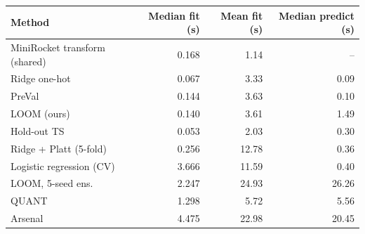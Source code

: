\begin{tabular}{lrrr}
\toprule
Method & Median fit (s) & Mean fit (s) & Median predict (s) \\
\midrule
MiniRocket transform (shared) & 0.168 & 1.14 & -- \\
Ridge one-hot & 0.067 & 3.33 & 0.09 \\
PreVal & 0.144 & 3.63 & 0.10 \\
LOOM (ours) & 0.140 & 3.61 & 1.49 \\
Hold-out TS & 0.053 & 2.03 & 0.30 \\
Ridge + Platt (5-fold) & 0.256 & 12.78 & 0.36 \\
Logistic regression (CV) & 3.666 & 11.59 & 0.40 \\
LOOM, 5-seed ens. & 2.247 & 24.93 & 26.26 \\
QUANT & 1.298 & 5.72 & 5.56 \\
Arsenal & 4.475 & 22.98 & 20.45 \\
\bottomrule
\end{tabular}
